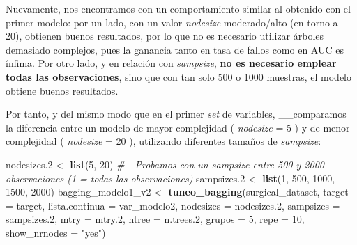 \documentclass[
]{article}
\newenvironment{Shaded}{\begin{snugshade}}{\end{snugshade}}
\newcommand{\CommentTok}[1]{\textcolor[rgb]{0.56,0.35,0.01}{\textit{#1}}}
\newcommand{\DataTypeTok}[1]{\textcolor[rgb]{0.13,0.29,0.53}{#1}}
\newcommand{\DecValTok}[1]{\textcolor[rgb]{0.00,0.00,0.81}{#1}}
\newcommand{\FloatTok}[1]{\textcolor[rgb]{0.00,0.00,0.81}{#1}}
\newcommand{\KeywordTok}[1]{\textcolor[rgb]{0.13,0.29,0.53}{\textbf{#1}}}
\newcommand{\NormalTok}[1]{#1}
\newcommand{\StringTok}[1]{\textcolor[rgb]{0.31,0.60,0.02}{#1}}
\begin{document}
Nuevamente, nos encontramos con un comportamiento similar al obtenido
con el primer modelo: por un lado, con un valor \emph{nodesize}
moderado/alto (en torno a 20), obtienen buenos resultados, por lo que no
es necesario utilizar árboles demasiado complejos, pues la ganancia
tanto en tasa de fallos como en AUC es ínfima. Por otro lado, y en
relación con \emph{sampsize}, \textbf{no es necesario emplear todas las
observaciones}, sino que con tan solo 500 o 1000 muestras, el modelo
obtiene buenos resultados.

Por tanto, y del mismo modo que en el primer \emph{set} de variables,
\_\_comparamos la diferencia entre un modelo de mayor complejidad (
\emph{nodesize} = 5 ) y de menor complejidad ( \emph{nodesize} = 20 ),
utilizando diferentes tamaños de \emph{sampsize}:

\begin{Shaded}
\begin{Highlighting}[]
\NormalTok{nodesizes}\FloatTok{.2}\NormalTok{ <{-}}\StringTok{ }\KeywordTok{list}\NormalTok{(}\DecValTok{5}\NormalTok{, }\DecValTok{20}\NormalTok{)}
\CommentTok{\#{-}{-} Probamos con un sampsize entre 500 y 2000 observaciones (1 = todas las observaciones)}
\NormalTok{sampsizes}\FloatTok{.2}\NormalTok{ <{-}}\StringTok{ }\KeywordTok{list}\NormalTok{(}\DecValTok{1}\NormalTok{, }\DecValTok{500}\NormalTok{, }\DecValTok{1000}\NormalTok{, }\DecValTok{1500}\NormalTok{, }\DecValTok{2000}\NormalTok{)}
\NormalTok{bagging\_modelo1\_v2 <{-}}\StringTok{ }\KeywordTok{tuneo\_bagging}\NormalTok{(surgical\_dataset, }\DataTypeTok{target =}\NormalTok{ target,}
                                    \DataTypeTok{lista.continua =}\NormalTok{ var\_modelo2,}
                                    \DataTypeTok{nodesizes =}\NormalTok{ nodesizes}\FloatTok{.2}\NormalTok{,}
                                    \DataTypeTok{sampsizes =}\NormalTok{ sampsizes}\FloatTok{.2}\NormalTok{, }\DataTypeTok{mtry =}\NormalTok{ mtry}\FloatTok{.2}\NormalTok{,}
                                    \DataTypeTok{ntree =}\NormalTok{ n.trees}\FloatTok{.2}\NormalTok{, }\DataTypeTok{grupos =} \DecValTok{5}\NormalTok{, }\DataTypeTok{repe =} \DecValTok{10}\NormalTok{,}
                                    \DataTypeTok{show\_nrnodes =} \StringTok{"yes"}\NormalTok{)}
\end{Highlighting}
\end{Shaded}
\end{document}
